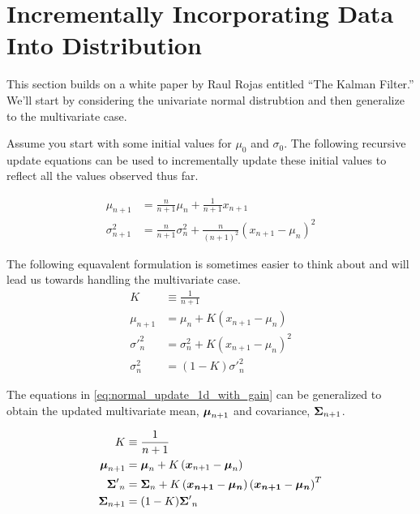 \documentclass[../../main.tex]{subfiles}
\begin{document}
\section{Incrementally Incorporating Data Into Distribution}
This section builds on a white paper by Raul Rojas entitled ``The Kalman
Filter.''  We'll start by considering the univariate normal distrubtion
and then generalize to the multivariate case. 

Assume you start with some initial values for $\mu_0$ and $\sigma_0$.  The
following recursive update equations can be used to incrementally update these
initial values to reflect all the values observed thus far.

\begin{align}
    \label{eq:normal_update_1d}
    \mu_{n+1} &= \frac{n}{n + 1} \mu_n  + \frac{1}{n+1}x_{n+1} \\
    \sigma_{n+1}^2 &= \frac{n}{n + 1}\sigma_n^2
        + \frac{n}{(n+1)^2} \left( x_{n+1} - \mu_n \right) ^ 2\nonumber
\end{align}

The following equavalent formulation is sometimes easier to think
about and will lead us towards handling the multivariate case.
\begin{align}
    \label{eq:normal_update_1d_with_gain}
    K &\equiv \frac{1}{n + 1}\\
    \mu_{n+1} &= \mu_n  + K \left( x_{n+1} - \mu_n \right)\nonumber\\
    {\sigma'}_n^2 &= \sigma_n^2 + K \left( x_{n+1} - \mu_n  \right)^2\nonumber\\
    \sigma_n^2 &= (1-K){\sigma'}_n^2\nonumber
\end{align}


The equations in \eqref{eq:normal_update_1d_with_gain} can be generalized to
obtain the updated multivariate mean, $\boldsymbol{\mu}_{n+1}$ and covariance,
$\boldsymbol{\Sigma}_{n+1}$.

\begin{align}
    \label{eq:normal_update_multi}
    K &\equiv \frac{1}{n + 1}\\
    \boldsymbol{\mu}_{n+1} &= \boldsymbol{\mu}_{n} +
                          K \left(
                              \boldsymbol{x}_{n+1} - \boldsymbol{\mu}_{n}
                          \right) \nonumber\nonumber\\
    {\boldsymbol{\Sigma}'}_{n} &= \boldsymbol{\Sigma}_{n}
                          + K\left( \boldsymbol{x_{n+1}} - \boldsymbol{\mu_n}  \right)
                          \left( \boldsymbol{x_{n+1}} - \boldsymbol{\mu_n} \right)^T\nonumber\\
    {\boldsymbol{\Sigma}}_{n+1} &= (1 - K) {\boldsymbol{\Sigma}'}_{n}\nonumber
\end{align}
\end{document}
